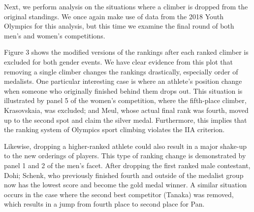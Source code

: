 \documentclass[12pt]{article}
\begin{document}
Next, we perform analysis on the situations where a climber is dropped
from the original standings. We once again make use of data from the
2018 Youth Olympics for this analysis, but this time we examine the
final round of both men's and women's competitions.

Figure 3 shows the modified versions of the rankings after each ranked
climber is excluded for both gender events. We have clear evidence from
this plot that removing a single climber changes the rankings
drastically, especially order of medalists. One particular interesting
case is where an athlete's position change when someone who originally
finished behind them drops out. This situation is illustrated by panel 5
of the women's competition, where the fifth-place climber, Krasovskaia,
was excluded; and Meul, whose actual final rank was fourth, moved up to
the second spot and claim the silver medal. Furthermore, this implies
that the ranking system of Olympics sport climbing violates the IIA
criterion.

Likewise, dropping a higher-ranked athlete could also result in a major
shake-up to the new orderings of players. This type of ranking change is
demonstrated by panel 1 and 2 of the men's facet. After dropping the
first ranked male contestant, Dohi; Schenk, who previously finished
fourth and outside of the medalist group now has the lowest score and
become the gold medal winner. A similar situation occurs in the case
where the second best competitor (Tanaka) was removed, which results in
a jump from fourth place to second place for Pan.
\end{document}
